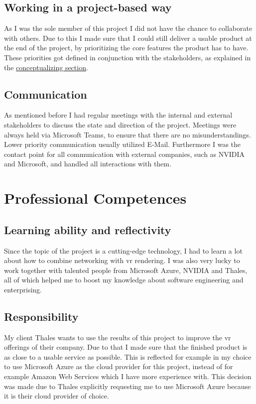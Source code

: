 \documentclass[]{article}
\begin{document}
\subsection{Working in a project-based way}
As I was the sole member of this project I did not have the chance to collaborate with others. Due to this I made sure that I could still deliver a usable product at the end of the project, by prioritizing the core features the product has to have. These priorities got defined in conjunction with the stakeholders, as explained in the \hyperref[sec:conc]{conceptualizing section}.

\subsection{Communication}
As mentioned before I had regular meetings with the internal and external stakeholders to discuss the state and direction of the project. Meetings were always held via Microsoft Teams, to ensure that there are no misunderstandings. Lower priority communication usually utilized E-Mail. Furthermore I was the contact point for all communication with external companies, such as NVIDIA and Microsoft, and handled all interactions with them.

\section{Professional Competences}
\subsection{Learning ability and reflectivity}
Since the topic of the project is a cutting-edge technology, I had to learn a lot about how to combine networking with \acrshort{vr} rendering. I was also very lucky to work together with talented people from Microsoft Azure, NVIDIA and Thales, all of which helped me to boost my knowledge about software engineering and enterprising. 

\subsection{Responsibility}
My client Thales wants to use the results of this project to improve the \acrshort{vr} offerings of their company. Due to that I made sure that the finished product is as close to a usable service as possible. This is reflected for example in my choice to use Microsoft Azure as the cloud provider for this project, instead of for example Amazon Web Services which I have more experience with. This decision was made due to Thales explicitly requesting me to use Microsoft Azure because it is their cloud provider of choice.

\printbibliography
\end{document}
